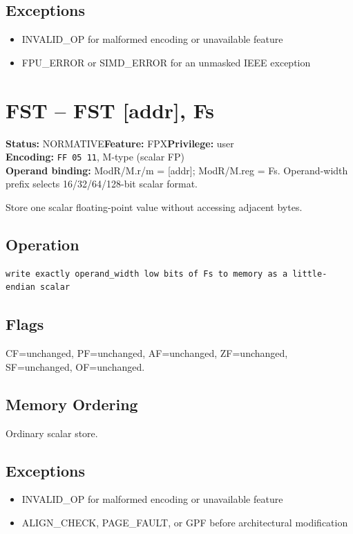 \documentclass[10pt]{article}
\begin{document}
\subsection*{Exceptions}
\begin{itemize}
\item INVALID\_OP for malformed encoding or unavailable feature
\item FPU\_ERROR or SIMD\_ERROR for an unmasked IEEE exception
\end{itemize}
\clearpage

\section{FST -- FST [addr], Fs}
\textbf{Status:} NORMATIVE\quad \textbf{Feature:} FPX\quad \textbf{Privilege:} user\\
\textbf{Encoding:} \texttt{FF 05 11}, M-type (scalar FP)\\
\textbf{Operand binding:} ModR/M.r/m = [addr]; ModR/M.reg = Fs. Operand-width prefix selects 16/32/64/128-bit scalar format.

Store one scalar floating-point value without accessing adjacent bytes.

\subsection*{Operation}
\begin{lstlisting}
write exactly operand_width low bits of Fs to memory as a little-endian scalar
\end{lstlisting}
\subsection*{Flags}
CF=unchanged, PF=unchanged, AF=unchanged, ZF=unchanged, SF=unchanged, OF=unchanged.
\subsection*{Memory Ordering}
Ordinary scalar store.
\subsection*{Exceptions}
\begin{itemize}
\item INVALID\_OP for malformed encoding or unavailable feature
\item ALIGN\_CHECK, PAGE\_FAULT, or GPF before architectural modification
\end{itemize}
\clearpage
\end{document}
